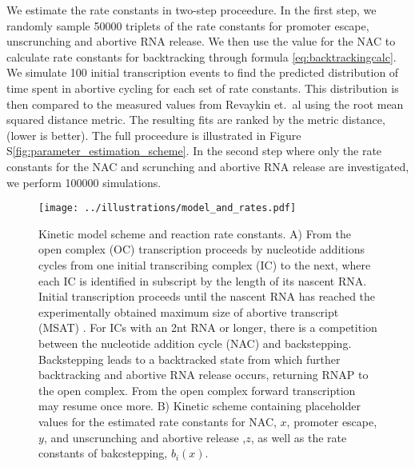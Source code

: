 We estimate the rate constants in two-step proceedure. In the first step, we
randomly sample 50000 triplets of the rate constants for promoter escape,
unscrunching and abortive RNA release. We then use the value for the NAC to
calculate rate constants for backtracking through formula
\eqref{eq:backtrackingcalc}. We simulate 100 initial transcription events
to find the predicted distribution of time spent in abortive cycling for each
set of rate constants. This distribution is then compared to the measured
values from Revaykin et.\ al \cite{revyakin_abortive_2006} using the root mean
squared distance metric. The resulting fits are ranked by the metric distance,
(lower is better). The full proceedure is illustrated in Figure
S\ref{fig:parameter_estimation_scheme}. In the second step where only the rate
constants for the NAC and scrunching and abortive RNA release are
investigated, we perform 100000 simulations.

\begin{figure}
	\begin{center}
        \texttt{[image: ../illustrations/model\_and\_rates.pdf]}
	\end{center}
    \caption{Kinetic model scheme and reaction rate constants. A) From the
    open complex (OC) transcription proceeds by nucleotide additions cycles
    from one initial transcribing complex (IC) to the next, where each IC is
    identified in subscript by the length of its nascent RNA. Initial
    transcription proceeds until the nascent RNA has reached the
    experimentally obtained maximum size of abortive transcript (MSAT)
    \cite{hsu_initial_2006}. For ICs with an 2nt RNA or longer, there is a
    competition between the nucleotide addition cycle (NAC) and backstepping.
    Backstepping leads to a backtracked state from which further backtracking
    and abortive RNA release occurs, returning RNAP to the open complex. From
    the open complex forward transcription may resume once more. B) Kinetic
    scheme containing placeholder values for the estimated rate constants for
    NAC, $x$, promoter escape, $y$, and unscrunching and abortive release ,$z$,
    as well as the rate constants of bakcstepping, $b_i(x)$.}
    \label{fig:model_and_rates}
\end{figure}

